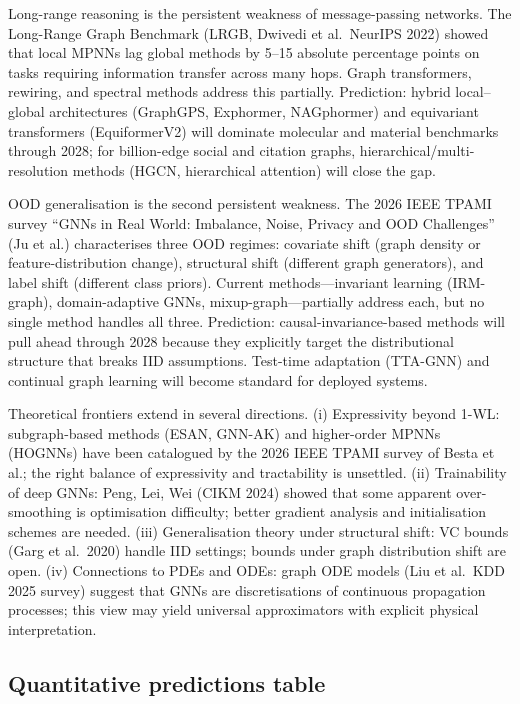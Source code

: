 Long-range reasoning is the persistent weakness of message-passing networks. The Long-Range Graph Benchmark (LRGB, Dwivedi et al.~NeurIPS 2022) showed that local MPNNs lag global methods by 5--15 absolute percentage points on tasks requiring information transfer across many hops. Graph transformers, rewiring, and spectral methods address this partially. Prediction: hybrid local--global architectures (GraphGPS, Exphormer, NAGphormer) and equivariant transformers (EquiformerV2) will dominate molecular and material benchmarks through 2028; for billion-edge social and citation graphs, hierarchical/multi-resolution methods (HGCN, hierarchical attention) will close the gap.

OOD generalisation is the second persistent weakness. The 2026 IEEE TPAMI survey ``GNNs in Real World: Imbalance, Noise, Privacy and OOD Challenges'' (Ju et al.) characterises three OOD regimes: covariate shift (graph density or feature-distribution change), structural shift (different graph generators), and label shift (different class priors). Current methods---invariant learning (IRM-graph), domain-adaptive GNNs, mixup-graph---partially address each, but no single method handles all three. Prediction: causal-invariance-based methods will pull ahead through 2028 because they explicitly target the distributional structure that breaks IID assumptions. Test-time adaptation (TTA-GNN) and continual graph learning will become standard for deployed systems.

Theoretical frontiers extend in several directions. (i) Expressivity beyond 1-WL: subgraph-based methods (ESAN, GNN-AK) and higher-order MPNNs (HOGNNs) have been catalogued by the 2026 IEEE TPAMI survey of Besta et al.; the right balance of expressivity and tractability is unsettled. (ii) Trainability of deep GNNs: Peng, Lei, Wei (CIKM 2024) showed that some apparent over-smoothing is optimisation difficulty; better gradient analysis and initialisation schemes are needed. (iii) Generalisation theory under structural shift: VC bounds (Garg et al.~2020) handle IID settings; bounds under graph distribution shift are open. (iv) Connections to PDEs and ODEs: graph ODE models (Liu et al.~KDD 2025 survey) suggest that GNNs are discretisations of continuous propagation processes; this view may yield universal approximators with explicit physical interpretation.

\subsection{Quantitative predictions table}\label{quantitative-predictions-table}

